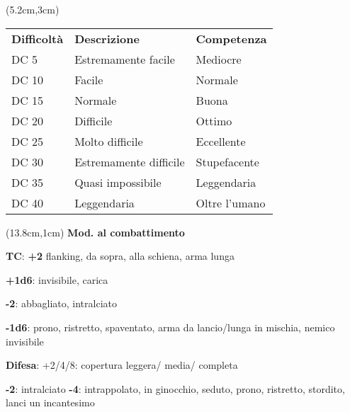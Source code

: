 \documentclass[a4paper,12 pt,openany]{book}
\begin{document}
\begin{textblock*}{8.5cm}(5.2cm,3cm) %
	\footnotesize
	\begin{tabular}{lll}
\textbf{Difficoltà} & \textbf{Descrizione} & \textbf{Competenza} \\
DC 5           & Estremamente facile              & Mediocre                        \\
DC 10          & Facile                           & Normale                         \\
DC 15          & Normale                          & Buona                           \\
DC 20          & Difficile                        & Ottimo                          \\
DC 25          & Molto difficile                  & Eccellente                      \\
DC 30          & Estremamente difficile           & Stupefacente                    \\
DC 35          & Quasi impossibile                & Leggendaria                     \\
DC 40          & Leggendaria                      & Oltre l'umano                   \\
		\end{tabular}
	\end{textblock*}



\begin{textblock*}{6.2cm}(13.8cm,1cm) %
\textbf{Mod. al combattimento}

{\footnotesize \textbf{TC}: \textbf{+2} flanking, da sopra, alla schiena, arma lunga

\textbf{+1d6}: invisibile, carica

\textbf{-2}: abbagliato, intralciato

\textbf{-1d6}: prono, ristretto, spaventato, arma da lancio/lunga in mischia, nemico invisibile

\textbf{Difesa}: +2/4/8: copertura leggera/ media/ completa

\textbf{-2}: intralciato \textbf{-4}: intrappolato, in ginocchio, seduto, prono, ristretto, stordito, lanci un incantesimo}
\end{textblock*}
\end{document}
